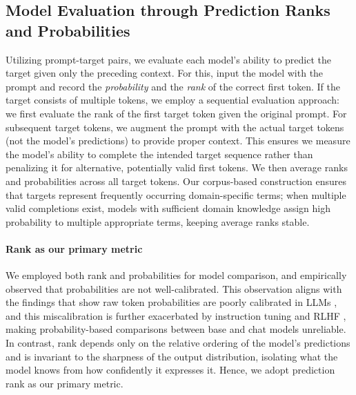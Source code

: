 \documentclass[10pt]{article}
\begin{document}
\subsection{Model Evaluation through Prediction Ranks and Probabilities} \vspace*{-.15cm}
\label{subsec:model-evaluation}
Utilizing prompt-target pairs, we evaluate each model's ability to predict the target given only the preceding context. 
For this, input the model with the prompt and record the \emph{probability} and the \emph{rank} of the correct first token.
If the target consists of multiple tokens, we employ a sequential evaluation approach: we first evaluate the rank of the first target token given the original prompt. For subsequent target tokens, we augment the prompt with the actual target tokens (not the model's predictions) to provide proper context. This ensures we measure the model's ability to complete the intended target sequence rather than penalizing it for alternative, potentially valid first tokens. We then average ranks and probabilities across all target tokens. Our corpus-based construction ensures that targets represent frequently occurring domain-specific terms; when multiple valid completions exist, models with sufficient domain knowledge assign high probability to multiple appropriate terms, keeping average ranks stable.

\paragraph{Rank as our primary metric} 
We employed both rank and probabilities for model comparison, and empirically observed that probabilities are not well-calibrated. This observation aligns with the findings that show raw token probabilities are poorly calibrated in LLMs \citep{jiang2021how}, and this miscalibration is further exacerbated by instruction tuning and RLHF \citep{kadavath2022language}, making probability-based comparisons between base and chat models unreliable. In contrast, rank depends only on the relative ordering of the model's predictions and is invariant to the sharpness of the output distribution, isolating what the model knows from how confidently it expresses it. Hence, we adopt prediction rank as our primary metric. %
\end{document}
